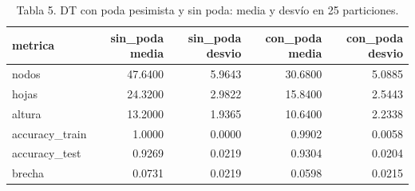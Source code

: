 \begin{table}
\caption{Tabla 5. DT con poda pesimista y sin poda: media y desvío en 25 particiones.}
\label{tab:poda}
\begin{tabular}{lrrrr}
\toprule
metrica & sin_poda media & sin_poda desvio & con_poda media & con_poda desvio \\
\midrule
nodos & 47.6400 & 5.9643 & 30.6800 & 5.0885 \\
hojas & 24.3200 & 2.9822 & 15.8400 & 2.5443 \\
altura & 13.2000 & 1.9365 & 10.6400 & 2.2338 \\
accuracy_train & 1.0000 & 0.0000 & 0.9902 & 0.0058 \\
accuracy_test & 0.9269 & 0.0219 & 0.9304 & 0.0204 \\
brecha & 0.0731 & 0.0219 & 0.0598 & 0.0215 \\
\bottomrule
\end{tabular}
\end{table}
